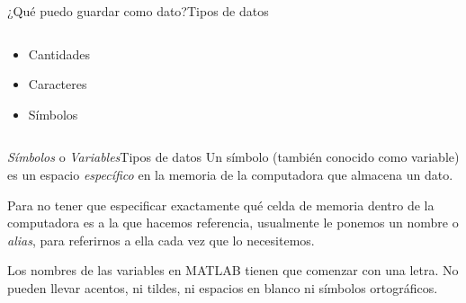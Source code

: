 \documentclass[spanish]{beamer}
\begin{document}
\begin{frame}{¿Qué puedo guardar como dato?}{Tipos de datos}

    \begin{columns}
        \begin{column}{0.5\textwidth}
            \begin{itemize}[<+->]
                \itemsep2.5ex
                \item \alert<4>{Cantidades}
                \item \alert<5>{Caracteres}
                \item \alert<6>{Símbolos}
            \end{itemize}
        \end{column}
        \begin{column}{0.5\textwidth}


        \end{column}
    \end{columns}
\end{frame}

\begin{frame}{\textit{Símbolos} o \textit{Variables}}{Tipos de datos}
Un \alert{símbolo} (también conocido como \alert{variable}) es un espacio \textit{específico} en la memoria de la computadora que almacena un dato. \pause

\bigskip

Para no tener que especificar exactamente qué celda de memoria dentro de la computadora es a la que hacemos referencia, usualmente le ponemos un nombre o \textit{alias}, para referirnos a ella cada vez que lo necesitemos. \pause

\bigskip

Los nombres de las variables en MATLAB tienen que comenzar con una letra. No pueden llevar acentos, ni tildes, ni espacios en blanco ni símbolos ortográficos.
\end{frame}
\end{document}
